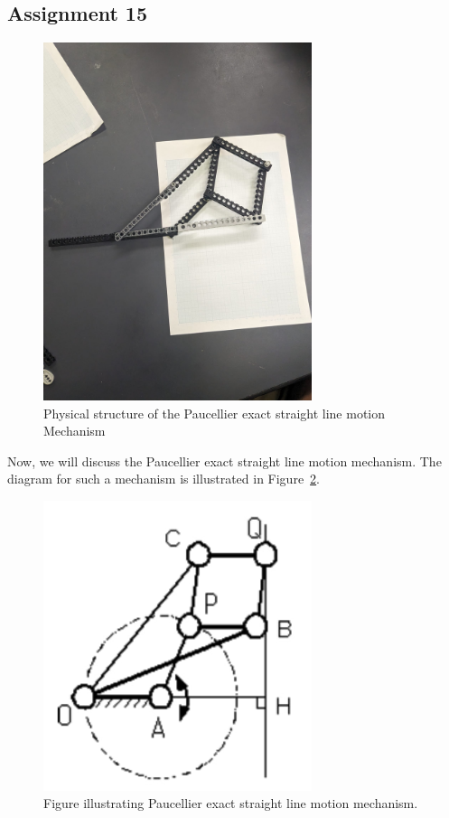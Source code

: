 \documentclass[12pt,a4paper]{report}
\begin{document}
\subsection{\textbf{Assignment 15}}
\begin{figure}[htbp]
            \centering
    \includegraphics[width=0.7\textwidth]{figures/ass15}
    \caption{Physical structure of the Paucellier exact straight line motion Mechanism}
    \label{fig:ass15}
\end{figure}
Now, we will discuss the Paucellier exact straight line motion mechanism. The diagram for such a mechanism is illustrated in 
Figure~\ref{fig:ass15-1}. 
\begin{figure}[htbp]
        \centering
    \includegraphics[width=0.7\textwidth]{figures/ass15-1}
    \caption{Figure illustrating Paucellier exact straight line motion mechanism.}
    \label{fig:ass15-1}
\end{figure}
\end{document}
